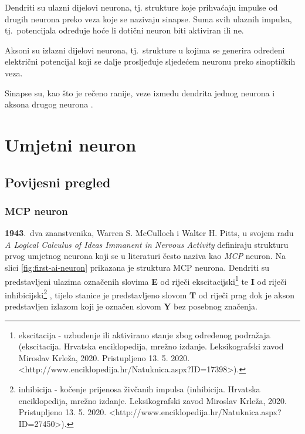 \documentclass[times, utf8, zavrsni]{fer}
\begin{document}
Dendriti  su ulazni dijelovi neurona, tj. strukture koje prihvaćaju impulse od drugih neurona preko veza koje se nazivaju sinapse. Suma svih ulaznih impulsa, tj.\ potencijala određuje hoće li dotični neuron biti aktiviran ili ne.

Aksoni  su izlazni dijelovi neurona, tj.\ strukture u kojima se generira određeni električni potencijal koji se dalje prosljeđuje sljedećem neuronu preko sinoptičkih veza.

Sinapse  su, kao što je rečeno ranije, veze između dendrita jednog neurona i aksona drugog neurona \citep{bioNeuron}.

\section{Umjetni neuron}

\subsection{Povijesni pregled}

\subsubsection{MCP neuron}

\textbf{1943}.\ dva znanstvenika, Warren S. McCulloch i Walter H. Pitts, u svojem radu \textit{A Logical Calculus of Ideas Immanent in Nervous Activity} definiraju strukturu prvog umjetnog neurona koji se u literaturi često naziva kao \textit{MCP} neuron. Na slici \ref{fig:first-ai-neuron} prikazana je struktura MCP neurona. Dendriti su predstavljeni ulazima označenih slovima \textbf{E} od riječi ekscitacijski\footnote{ekscitacija - uzbuđenje ili aktivirano stanje zbog određenog podražaja (ekscitacija. Hrvatska enciklopedija, mrežno izdanje. Leksikografski zavod Miroslav Krleža, 2020. Pristupljeno 13. 5. 2020. <http://www.enciklopedija.hr/Natuknica.aspx?ID=17398>).}  te \textbf{I} od riječi inhibicijski\footnote{inhibicija - kočenje prijenosa živčanih impulsa (inhibicija. Hrvatska enciklopedija, mrežno izdanje. Leksikografski zavod Miroslav Krleža, 2020. Pristupljeno 13. 5. 2020. <http://www.enciklopedija.hr/Natuknica.aspx?ID=27450>).} , tijelo stanice je predstavljeno slovom \textbf{T} od riječi prag  dok je akson predstavljen izlazom koji je označen slovom \textbf{Y} bez posebnog značenja.
\end{document}
